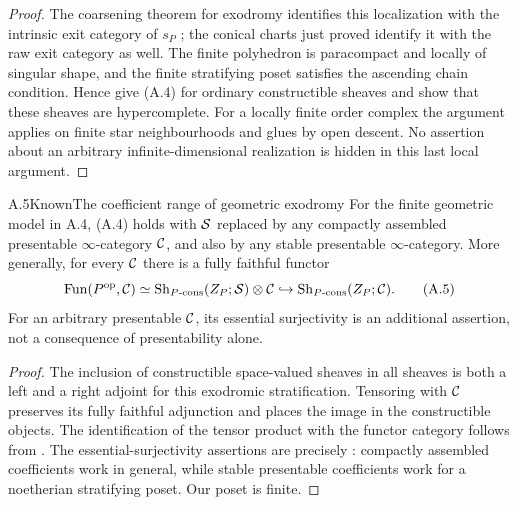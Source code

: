 \begin{proof}
The coarsening theorem for exodromy identifies this localization with the
intrinsic exit category of $s_P$
\citep[Theorem 3.3.5 and Theorem 5.1.7]{HPT2026}; the conical charts just
proved identify it with the raw exit category as well. The finite
polyhedron is paracompact and locally of singular shape, and the finite
stratifying poset satisfies the ascending chain condition. Hence
\citet[Proposition A.5.9 and Theorem A.9.3]{LurieHA} give (A.4) for
ordinary constructible sheaves and show that these sheaves are
hypercomplete.
For a locally finite order complex the argument applies on finite star
neighbourhoods and glues by open descent. No assertion about an arbitrary
infinite-dimensional realization is hidden in this last local argument.
\end{proof}

\begin{statement}{A.5}{Known}{The coefficient range of geometric exodromy}
For the finite geometric model in A.4, (A.4) holds with $\mathcal S$ replaced
by any compactly assembled presentable $\infty$-category $\mathcal C$, and also
by any stable presentable $\infty$-category. More generally, for every
$\mathcal C$ there is a fully faithful functor
\[
 \operatorname{Fun}(P^{\mathrm{op}},\mathcal C)
 \simeq \operatorname{Sh}_{P\text{-cons}}(Z_P;\mathcal S)\otimes\mathcal C
 \hookrightarrow \operatorname{Sh}_{P\text{-cons}}(Z_P;\mathcal C).
\tag{A.5}
\]
For an arbitrary presentable $\mathcal C$, its essential surjectivity is an
additional assertion, not a consequence of presentability alone.
\end{statement}
\begin{proof}
The inclusion of constructible space-valued sheaves in all sheaves is
both a left and a right adjoint for this exodromic stratification.
Tensoring with $\mathcal C$ preserves its fully faithful adjunction and places
the image in the constructible objects. The identification of the tensor
product with the functor category follows from
\citet[Proposition 4.8.1.17]{LurieHA}.
The essential-surjectivity assertions are precisely
\citet[Lemma 4.1.2 and Corollary 4.1.15]{HPT2026}: compactly assembled
coefficients work in general, while stable presentable coefficients work
for a noetherian stratifying poset. Our poset is finite.
\end{proof}

